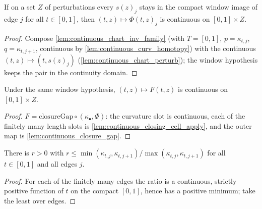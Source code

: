 \begin{lemma}

  \label{lem:continuous_closing_cell_apply}
  If on a set $Z$ of perturbations every $s(z)_j$ stays in the compact window
  image of edge $j$ for all $t \in [0,1]$, then $(t,z) \mapsto \Phi(t,z)_j$ is
  continuous on $[0,1] \times Z$.
\end{lemma}
\begin{proof}

\leanok
  Compose \cref{lem:continuous_chart_inv_family} (with $T = [0,1]$,
  $p = \kappa_{t,j}$, $q = \kappa_{t,j+1}$, continuous by
  \cref{lem:continuous_curv_homotopy}) with the continuous
  $(t,z) \mapsto (t, s(z)_j)$ (\cref{lem:continuous_chart_perturb}); the
  window hypothesis keeps the pair in the continuity domain.
\end{proof}

\begin{lemma}

  \label{lem:continuous_closing_gap}
  Under the same window hypothesis, $(t,z) \mapsto F(t,z)$ is continuous on
  $[0,1] \times Z$.
\end{lemma}
\begin{proof}

\leanok
  $F = \mathrm{closureGap} \circ (\kappa_\bullet, \Phi)$: the curvature slot
  is continuous, each of the finitely many length slots is
  \cref{lem:continuous_closing_cell_apply}, and the outer map is
  \cref{lem:continuous_closure_gap}.
\end{proof}

\begin{lemma}

  \label{lem:exists_ratio_bound}
  There is $r > 0$ with $r \le \min(\kappa_{t,j}, \kappa_{t,j+1}) /
  \max(\kappa_{t,j}, \kappa_{t,j+1})$ for all $t \in [0,1]$ and all edges $j$.
\end{lemma}
\begin{proof}

\leanok
  For each of the finitely many edges the ratio is a continuous, strictly
  positive function of $t$ on the compact $[0,1]$, hence has a positive
  minimum; take the least over edges.
\end{proof}

